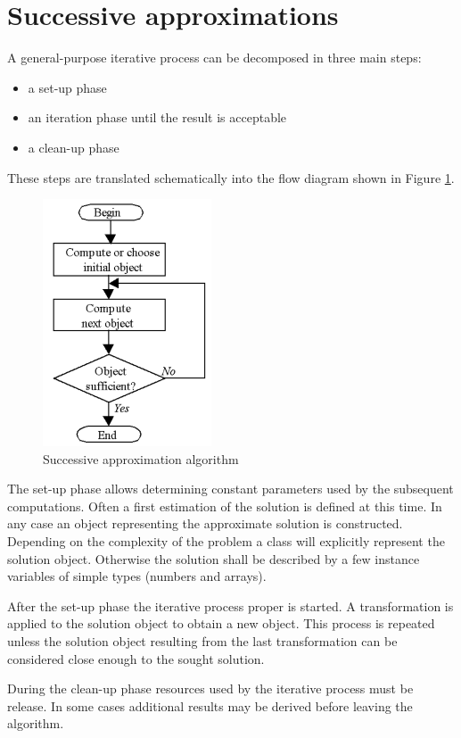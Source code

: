 \documentclass[twoside]{book}
\begin{document}
\section{Successive approximations}
\label{sec:iteration} A general-purpose iterative process can be
decomposed in three main steps:
\begin{itemize}
  \item a set-up phase
  \item an iteration phase until the result is acceptable
  \item a clean-up phase
\end{itemize}
\noindent These steps are translated schematically into the flow
diagram shown in Figure \ref{fig:itercoarse}.
\begin{figure}
\centering\includegraphics[width=5cm]{Figures/IterationCoarseFlow}
\caption{Successive approximation algorithm}\label{fig:itercoarse}
\end{figure}

The set-up phase allows determining constant parameters used by
the subsequent computations. Often a first estimation of the
solution is defined at this time. In any case an object
representing the approximate solution is constructed. Depending on
the complexity of the problem a class will explicitly represent
the solution object. Otherwise the solution shall be described by
a few instance variables of simple types (numbers and arrays).

After the set-up phase the iterative process proper is started. A
transformation is applied to the solution object to obtain a new
object. This process is repeated unless the solution object
resulting from the last transformation can be considered close
enough to the sought solution.

During the clean-up phase resources used by the iterative process
must be release. In some cases additional results may be derived
before leaving the algorithm.
\end{document}
